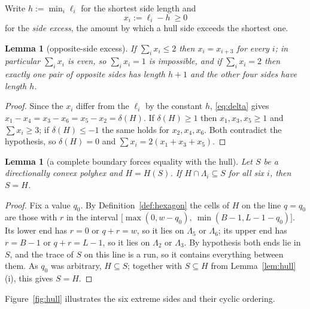 \documentclass[11pt]{article}
\theoremstyle{plain}
\newtheorem{lemma}[theorem]{Lemma}
\theoremstyle{definition}
\theoremstyle{remark}
\begin{document}
Write \(h:=\min_{i}\ell_{i}\) for the shortest side length and
\[
   x_{i}:=\ell_{i}-h\ \ge0
\]
for the \emph{side excess}, the amount by which a hull side exceeds the shortest one.

\begin{lemma}[opposite-side excess]\label{lem:oppair}
If \(\sum_{i}x_{i}\le2\) then \(x_{i}=x_{i+3}\) for every \(i\); in particular
\(\sum_{i}x_{i}\) is even, so \(\sum_{i}x_{i}=1\) is impossible, and if
\(\sum_{i}x_{i}=2\) then exactly one pair of opposite sides has length \(h+1\) and the other
four sides have length \(h\).
\end{lemma}

\begin{proof}
Since the \(x_{i}\) differ from the \(\ell_{i}\) by the constant \(h\), \eqref{eq:delta}
gives \(x_{1}-x_{4}=x_{3}-x_{6}=x_{5}-x_{2}=\delta(H)\). If \(\delta(H)\ge1\) then
\(x_{1},x_{3},x_{5}\ge1\) and \(\sum x_{i}\ge3\); if \(\delta(H)\le-1\) the same holds for
\(x_{2},x_{4},x_{6}\). Both contradict the hypothesis, so \(\delta(H)=0\) and
\(\sum x_{i}=2(x_{1}+x_{3}+x_{5})\).
\end{proof}


\begin{lemma}[a complete boundary forces equality with the hull]\label{lem:complete}
Let \(S\) be a directionally convex polyhex and \(H=H(S)\). If \(H\cap\Lambda_{i}\subseteq S\)
for all six \(i\), then \(S=H\).
\end{lemma}

\begin{proof}
Fix a value \(q_{0}\). By Definition~\ref{def:hexagon} the cells of \(H\) on the line
\(q=q_{0}\) are those with \(r\) in the interval
\(\bigl[\max(0,w-q_{0}),\ \min(B-1,L-1-q_{0})\bigr]\). Its lower end has \(r=0\) or
\(q+r=w\), so it lies on \(\Lambda_{5}\) or \(\Lambda_{6}\); its upper end has \(r=B-1\) or
\(q+r=L-1\), so it lies on \(\Lambda_{2}\) or \(\Lambda_{3}\). By hypothesis both ends lie
in \(S\), and the trace of \(S\) on this line is a run, so it contains everything between
them. As \(q_{0}\) was arbitrary, \(H\subseteq S\); together with \(S\subseteq H\) from
Lemma~\ref{lem:hull}(i), this gives \(S=H\).
\end{proof}


Figure~\ref{fig:hull} illustrates the six extreme sides and their cyclic ordering.
\end{document}

